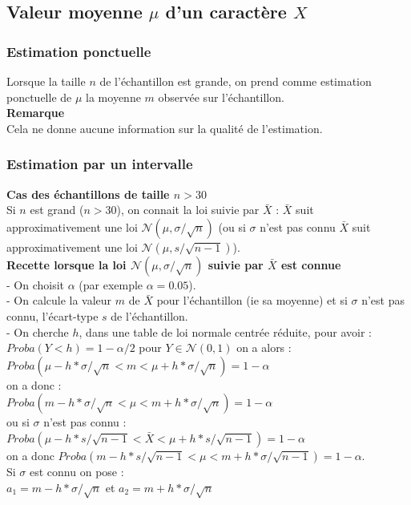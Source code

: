 \documentclass[a4paper,11pt]{book}
\begin{document}
\subsection{Valeur moyenne $\mu$ d'un caract\`ere $X$}
\subsubsection{Estimation ponctuelle}
Lorsque la taille $n$ de l'\'echantillon est grande, on prend comme estimation 
ponctuelle de $\mu$ la  moyenne $m$ observ\'ee sur l'\'echantillon.\\
{\bf Remarque}\\
Cela ne donne aucune information sur la qualit\'e de l'estimation. 
\subsubsection{Estimation par un intervalle}
{\bf Cas des \'echantillons de taille $n>30$}\\
Si $n$ est grand ($n>30$), on connait la loi suivie par $\bar X$ : $\bar X$ 
suit approximativement une loi $\mathcal N(\mu,\sigma/\sqrt{n})$ (ou si 
$\sigma$ n'est pas connu $\bar X$ suit approximativement une loi 
$\mathcal N(\mu,s/\sqrt {n-1})$).\\
{\bf Recette lorsque la loi $\mathcal N(\mu,\sigma/\sqrt{n})$ suivie par
$\bar X$ est connue}\\
- On choisit $\alpha$ (par exemple $\alpha=0.05$).\\
- On calcule la valeur $m$ de $\bar X$ pour l'\'echantillon (ie sa moyenne) et 
si $\sigma$ n'est pas connu, l'\'ecart-type $s$ de l'\'echantillon. \\
- On cherche $h$, dans une table de loi normale centr\'ee r\'eduite,
 pour avoir :\\
$Proba(Y<h)=1-\alpha/2$ pour $Y\in \mathcal N(0,1)$ on a alors :\\
$Proba(\mu-h*\sigma/\sqrt{n}<m<\mu+h*\sigma/\sqrt{n})=1-\alpha$ \\
on a donc :\\
$Proba(m-h*\sigma/\sqrt{n}<\mu<m+h*\sigma/\sqrt{n})=1-\alpha$\\
ou si $\sigma$ n'est pas connu :\\
$Proba(\mu-h*s/\sqrt{n-1}<\bar X<\mu+h*s/\sqrt{n-1})=1-\alpha$\\
on a donc $Proba(m-h*s/\sqrt{n-1}<\mu<m+h*\sigma/\sqrt{n-1})=1-\alpha$.\\
Si $\sigma$ est connu on pose :\\
$a_1=m-h*\sigma/\sqrt{n}$ et $a_2=m+h*\sigma/\sqrt{n}$\\
\end{document}

